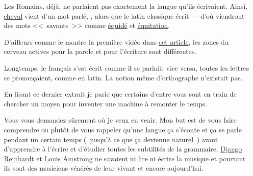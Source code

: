 
\begin{mdframed}[style=citestyle, frametitle={Extrait du livre~\cite{brunel}.}]
  Les Romains, déjà, ne parlaient pas exactement la langue qu'ils
  écrivaient. Ainsi, \underline{cheval} vient d'un mot parlé,
  , alors que le latin classique écrit  ---
  d'où viendront des mots <<~savants~>> comme \underline{équidé} et
  \underline{équitation}.
\end{mdframed}

D'ailleurs comme le montre la première vidéo dans
\href{http://doyouspeakenglish.fr/prescriptiviste-ou-descriptiviste/}{cet
  article}, les zones du cerveau actives pour la parole et pour l'écriture sont différentes.\par

\begin{mdframed}[style=citestyle, frametitle={Extrait du livre~\cite{brunel}.}]
  Longtemps, le français s'est écrit comme il se parlait; vice versa,
  toutes les lettres se prononçaient, comme en latin. La notion même
  d'orthographe n'existait pas.
\end{mdframed}

En lisant ce dernier extrait je parie que certains d'entre vous sont en train
de chercher un moyen pour inventer une machine à remonter le temps. 

Vous vous demandez sûrement où je veux en venir. Mon but est de vous
faire comprendre ou plutôt de vous rappeler qu'une langue ça s'écoute
et ça se parle pendant un certain temps (~jusqu'à ce que ça devienne
naturel~) avant d'apprendre à l'écrire et d'étudier toutes les
subtilités de la grammaire. \href{https://fr.wikipedia.org/wiki/Django\_Reinhardt}{Django Reinhardt} et \href{https://fr.wikipedia.org/wiki/Louis\_Armstrong}{Louis Amstrong} ne
savaient ni lire ni écrire la musique et pourtant ils sont des
musiciens vénérés de leur vivant et encore aujourd'hui.\par

